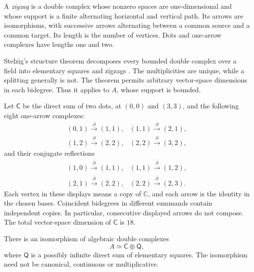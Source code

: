A \emph{zigzag} is a double complex whose nonzero spaces are
one-dimensional and whose support is a finite alternating
horizontal and vertical path. Its arrows are isomorphisms, with
successive arrows alternating between a common source and a
common target. Its length is the number of vertices.
Dots and one-arrow complexes have lengths one and two.

Stelzig's structure theorem decomposes every bounded double
complex over a field into elementary squares and zigzags
\cite[Theorem~3]{StelzigDouble}.
The multiplicities are unique, while a splitting generally is not.
The theorem permits arbitrary vector-space dimensions in each
bidegree. Thus it applies to $A$, whose support is bounded.

Let $\mathsf C$ be the direct sum of two dots, at $(0,0)$ and
$(3,3)$, and the following eight one-arrow complexes:
\begin{equation}\label{bc:eq:horizontal-arrows}
 \begin{array}{ll}
 (0,1)\xrightarrow{\ \partial\ }(1,1),&
 (1,1)\xrightarrow{\ \partial\ }(2,1),\\[2pt]
 (1,2)\xrightarrow{\ \partial\ }(2,2),&
 (2,2)\xrightarrow{\ \partial\ }(3,2),
 \end{array}
\end{equation}
and their conjugate reflections
\begin{equation}\label{bc:eq:vertical-arrows}
 \begin{array}{ll}
 (1,0)\xrightarrow{\ \bar\partial\ }(1,1),&
 (1,1)\xrightarrow{\ \bar\partial\ }(1,2),\\[2pt]
 (2,1)\xrightarrow{\ \bar\partial\ }(2,2),&
 (2,2)\xrightarrow{\ \bar\partial\ }(2,3).
 \end{array}
\end{equation}
Each vertex in these displays means a copy of $\mathbb C$, and
each arrow is the identity in the chosen bases. Coincident
bidegrees in different summands contain independent copies.
In particular, consecutive displayed arrows do not compose.
The total vector-space dimension of $\mathsf C$ is $18$.

\begin{theorem}\label{bc:thm:double-complex}
There is an isomorphism of algebraic double complexes
\begin{equation}\label{bc:eq:splitting}
             A\simeq\mathsf C\oplus\mathsf Q,
\end{equation}
where $\mathsf Q$ is a possibly infinite direct sum of elementary
squares. The isomorphism need not be canonical, continuous or
multiplicative.
\end{theorem}

